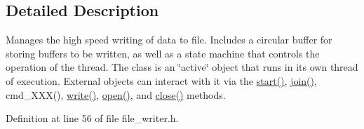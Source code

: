 \subsection{Detailed Description}
Manages the high speed writing of data to file. Includes a circular buffer for storing buffers to be written, as well as a state machine that controls the operation of the thread. The class is an \char`\"{}active\char`\"{} object that runs in its own thread of execution. External objects can interact with it via the \hyperlink{class_file_writer_a49837b1a8ddfa509932e66830327c92f}{start()}, \hyperlink{class_file_writer_add364eb1a603167a70713eb87d90ee52}{join()}, cmd\_\-XXX(), \hyperlink{class_file_writer_aed0ee15de36255a2883b5f15c710848c}{write()}, \hyperlink{class_file_writer_a3cb740ffb3e76673dd5b8f2f02364814}{open()}, and \hyperlink{class_file_writer_a66f2225935e8b52087c18bb55e3de25f}{close()} methods. 

Definition at line 56 of file file\_\-writer.h.



